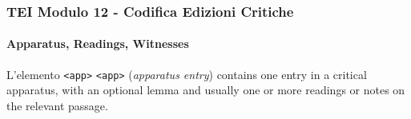 \begin{frame}
    \frametitle{TEI Modulo 12 - Codifica Edizioni Critiche}
    \framesubtitle{Apparatus, Readings, Witnesses}
    \addtocounter{nframe}{1}












    \begin{block}{L'elemento \texttt{<app>}}
        \texttt{<app>} (\textit{apparatus entry}) contains one entry in a critical apparatus, with an optional lemma and usually one or more readings or notes on the relevant passage.
    \end{block}

\end{frame}


